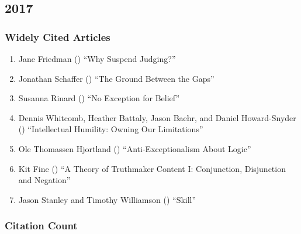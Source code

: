 \documentclass[
  10pt,
  letterpaper,
  DIV=11,
  numbers=noendperiod,
  twoside]{scrartcl}
\providecommand{\tightlist}{%
  \setlength{\itemsep}{0pt}\setlength{\parskip}{0pt}}\usepackage{longtable,booktabs,array}
\begin{document}
\newpage

\subsection{2017}\label{sec-s2017}

\subsubsection*{Widely Cited Articles}\label{widely-cited-articles-60}

\begin{enumerate}
\def\labelenumi{\arabic{enumi}.}
\tightlist
\item
  Jane Friedman () ``Why Suspend
  Judging?''
\item
  Jonathan Schaffer () ``The
  Ground Between the Gaps''
\item
  Susanna Rinard () ``No
  Exception for Belief''
\item
  Dennis Whitcomb, Heather Battaly, Jason Baehr, and Daniel
  Howard-Snyder () ``Intellectual
  Humility: Owning Our Limitations''
\item
  Ole Thomassen Hjortland ()
  ``Anti-Exceptionalism About Logic''
\item
  Kit Fine () ``A Theory of
  Truthmaker Content I: Conjunction, Disjunction and Negation''
\item
  Jason Stanley and Timothy Williamson
  () ``Skill''
\end{enumerate}

\subsubsection*{Citation Count}\label{sec-count-2017}
\end{document}
